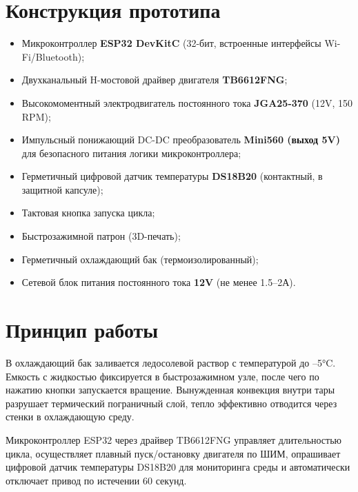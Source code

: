 \documentclass[a4paper,12pt]{article}
\begin{document}
\section{Конструкция прототипа}
\begin{itemize}
    \item Микроконтроллер \textbf{ESP32 DevKitC} (32-бит, встроенные интерфейсы Wi-Fi/Bluetooth);
    \item Двухканальный H-мостовой драйвер двигателя \textbf{TB6612FNG};
    \item Высокомоментный электродвигатель постоянного тока \textbf{JGA25-370} (12V, 150 RPM);
    \item Импульсный понижающий DC-DC преобразователь \textbf{Mini560 (выход 5V)} для безопасного питания логики микроконтроллера;
    \item Герметичный цифровой датчик температуры \textbf{DS18B20} (контактный, в защитной капсуле);
    \item Тактовая кнопка запуска цикла;
    \item Быстрозажимной патрон (3D-печать);
    \item Герметичный охлаждающий бак (термоизолированный);
    \item Сетевой блок питания постоянного тока \textbf{12V} (не менее 1.5--2А).
\end{itemize}

\section{Принцип работы}
В охлаждающий бак заливается ледосолевой раствор с температурой до --5°C. Емкость с жидкостью фиксируется в быстрозажимном узле, после чего по нажатию кнопки запускается вращение. Вынужденная конвекция внутри тары разрушает термический пограничный слой, тепло эффективно отводится через стенки в охлаждающую среду. 

Микроконтроллер ESP32 через драйвер TB6612FNG управляет длительностью цикла, осуществляет плавный пуск/остановку двигателя по ШИМ, опрашивает цифровой датчик температуры DS18B20 для мониторинга среды и автоматически отключает привод по истечении 60 секунд.
\end{document}
